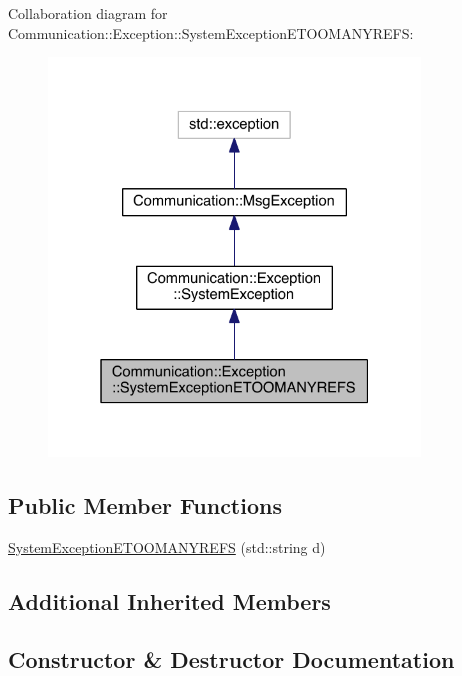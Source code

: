 Collaboration diagram for Communication\+:\+:Exception\+:\+:System\+Exception\+E\+T\+O\+O\+M\+A\+N\+Y\+R\+E\+F\+S\+:\nopagebreak
\begin{figure}[H]
\begin{center}
\leavevmode
\includegraphics[width=280pt]{class_communication_1_1_exception_1_1_system_exception_e_t_o_o_m_a_n_y_r_e_f_s__coll__graph}
\end{center}
\end{figure}
\subsection*{Public Member Functions}
\begin{DoxyCompactItemize}
\item 
\hyperlink{class_communication_1_1_exception_1_1_system_exception_e_t_o_o_m_a_n_y_r_e_f_s_a633242f7a9e194b0a567a372ed09927c}{System\+Exception\+E\+T\+O\+O\+M\+A\+N\+Y\+R\+E\+F\+S} (std\+::string d)
\end{DoxyCompactItemize}
\subsection*{Additional Inherited Members}


\subsection{Constructor \& Destructor Documentation}
\hypertarget{class_communication_1_1_exception_1_1_system_exception_e_t_o_o_m_a_n_y_r_e_f_s_a633242f7a9e194b0a567a372ed09927c}{}
